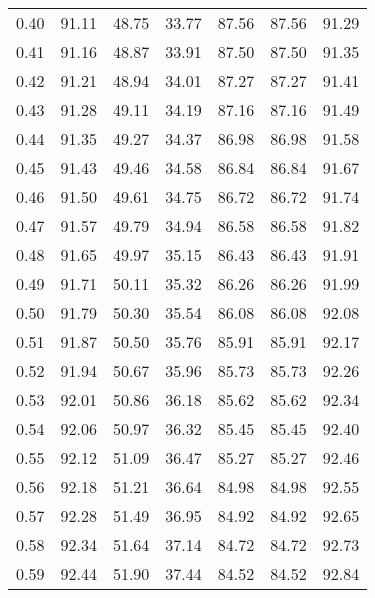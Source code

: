 \begin{tabular}{|c|c|c|c|c|c|c|}
      0.40 &     91.11 &     48.75 &      33.77 &   87.56 &      87.56 &         91.29 \\
      0.41 &     91.16 &     48.87 &      33.91 &   87.50 &      87.50 &         91.35 \\
      0.42 &     91.21 &     48.94 &      34.01 &   87.27 &      87.27 &         91.41 \\
      0.43 &     91.28 &     49.11 &      34.19 &   87.16 &      87.16 &         91.49 \\
      0.44 &     91.35 &     49.27 &      34.37 &   86.98 &      86.98 &         91.58 \\
      0.45 &     91.43 &     49.46 &      34.58 &   86.84 &      86.84 &         91.67 \\
      0.46 &     91.50 &     49.61 &      34.75 &   86.72 &      86.72 &         91.74 \\
      0.47 &     91.57 &     49.79 &      34.94 &   86.58 &      86.58 &         91.82 \\
      0.48 &     91.65 &     49.97 &      35.15 &   86.43 &      86.43 &         91.91 \\
      0.49 &     91.71 &     50.11 &      35.32 &   86.26 &      86.26 &         91.99 \\
      0.50 &     91.79 &     50.30 &      35.54 &   86.08 &      86.08 &         92.08 \\
      0.51 &     91.87 &     50.50 &      35.76 &   85.91 &      85.91 &         92.17 \\
      0.52 &     91.94 &     50.67 &      35.96 &   85.73 &      85.73 &         92.26 \\
      0.53 &     92.01 &     50.86 &      36.18 &   85.62 &      85.62 &         92.34 \\
      0.54 &     92.06 &     50.97 &      36.32 &   85.45 &      85.45 &         92.40 \\
      0.55 &     92.12 &     51.09 &      36.47 &   85.27 &      85.27 &         92.46 \\
      0.56 &     92.18 &     51.21 &      36.64 &   84.98 &      84.98 &         92.55 \\
      0.57 &     92.28 &     51.49 &      36.95 &   84.92 &      84.92 &         92.65 \\
      0.58 &     92.34 &     51.64 &      37.14 &   84.72 &      84.72 &         92.73 \\
      0.59 &     92.44 &     51.90 &      37.44 &   84.52 &      84.52 &         92.84 \\

\end{tabular}
